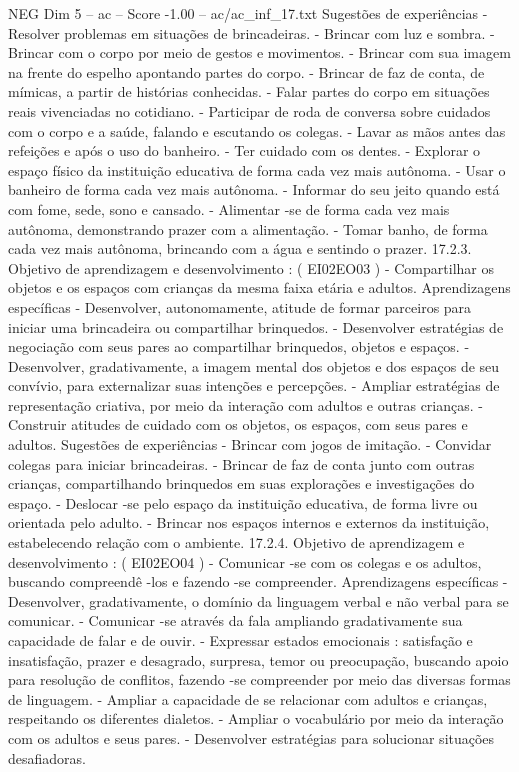 \begin{textsample}{NEG Dim 5 – ac – Score -1.00 – ac/ac\_inf\_17.txt}
Sugestões de experiências - Resolver problemas em situações de brincadeiras. - Brincar com luz e sombra. - Brincar com o corpo por meio de gestos e movimentos. - Brincar com sua imagem na frente do espelho apontando partes do corpo. - Brincar de faz de conta, de mímicas, a partir de histórias conhecidas. - Falar partes do corpo em situações reais vivenciadas no cotidiano. - Participar de roda de conversa sobre cuidados com o corpo e a saúde, falando e escutando os colegas. - Lavar as mãos antes das refeições e após o uso do banheiro. - Ter cuidado com os dentes. - Explorar o espaço físico da instituição educativa de forma cada vez mais autônoma. - Usar o banheiro de forma cada vez mais autônoma. - Informar do seu jeito quando está com fome, sede, sono e cansado. - Alimentar -se de forma cada vez mais autônoma, demonstrando prazer com a alimentação. - Tomar banho, de forma cada vez mais autônoma, brincando com a água e sentindo o prazer. 17.2.3.
Objetivo de aprendizagem e desenvolvimento : ( EI02EO03 ) - Compartilhar os objetos e os espaços com crianças da mesma faixa etária e adultos.
Aprendizagens específicas - Desenvolver, autonomamente, atitude de formar parceiros para iniciar uma brincadeira ou compartilhar brinquedos. - Desenvolver estratégias de negociação com seus pares ao compartilhar brinquedos, objetos e espaços. - Desenvolver, gradativamente, a imagem mental dos objetos e dos espaços de seu convívio, para externalizar suas intenções e percepções. - Ampliar estratégias de representação criativa, por meio da interação com adultos e outras crianças. - Construir atitudes de cuidado com os objetos, os espaços, com seus pares e adultos.
Sugestões de experiências - Brincar com jogos de imitação. - Convidar colegas para iniciar brincadeiras. - Brincar de faz de conta junto com outras crianças, compartilhando brinquedos em suas explorações e investigações do espaço. - Deslocar -se pelo espaço da instituição educativa, de forma livre ou orientada pelo adulto. - Brincar nos espaços internos e externos da instituição, estabelecendo relação com o ambiente. 17.2.4.
Objetivo de aprendizagem e desenvolvimento : ( EI02EO04 ) - Comunicar -se com os colegas e os adultos, buscando compreendê -los e fazendo -se compreender.
Aprendizagens específicas - Desenvolver, gradativamente, o domínio da linguagem verbal e não verbal para se comunicar. - Comunicar -se através da fala ampliando gradativamente sua capacidade de falar e de ouvir. - Expressar estados emocionais : satisfação e insatisfação, prazer e desagrado, surpresa, temor ou preocupação, buscando apoio para resolução de conflitos, fazendo -se compreender por meio das diversas formas de linguagem. - Ampliar a capacidade de se relacionar com adultos e crianças, respeitando os diferentes dialetos. - Ampliar o vocabulário por meio da interação com os adultos e seus pares. - Desenvolver estratégias para solucionar situações desafiadoras.

\end{textsample}
